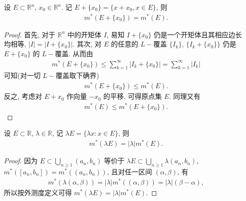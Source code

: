 \documentclass[../../main.tex]{subfiles}
\begin{document}
\begin{theorem}[外测度的平移不变性]\label{theorem:外测度的平移不变性}
设 \(E \subset \mathbb{R}^n\), \(x_0 \in \mathbb{R}^n\). 记 \(E + \{x_0\} = \{x + x_0, x \in E\}\), 则
\begin{align}
m^*(E + \{x_0\}) = m^*(E). \label{eq:2.1}
\end{align}
\end{theorem}
\begin{proof}
首先, 对于 \(\mathbb{R}^n\) 中的开矩体 \(I\), 易知 \(I + \{x_0\}\) 仍是一个开矩体且其相应边长均相等, \(|I| = |I + \{x_0\}|\). 其次, 对 \(E\) 的任意的 \(L -\)覆盖 \(\{I_k\}\), \(\{I_k + \{x_0\}\}\) 仍是 \(E + \{x_0\}\) 的 \(L -\)覆盖. 从而由
\begin{align*}
m^*(E + \{x_0\}) \leq \sum_{k = 1}^{\infty} |I_k + \{x_0\}| = \sum_{k = 1}^{\infty} |I_k|
\end{align*}
可知(对一切 \(L -\)覆盖取下确界)
\begin{align*}
m^*(E + \{x_0\}) \leq m^*(E).
\end{align*}
反之, 考虑对 \(E + x_0\) 作向量 \(-x_0\) 的平移, 可得原点集 \(E\). 同理又有
\begin{align*}
m^*(E) \leq m^*(E + \{x_0\}).
\end{align*} 
\end{proof}

\begin{theorem}[外测度的数乘]\label{theorem:外测度的数乘}
设 \(E \subset \mathbb{R}\), \(\lambda \in \mathbb{R}\), 记 \(\lambda E = \{ \lambda x : x \in E\}\), 则
\begin{align*}
m^*(\lambda E) = |\lambda| m^*(E).
\end{align*}
\end{theorem}
\begin{proof}
因为 \(E \subset \bigcup_{n \geq 1} (a_n, b_n)\) 等价于 \(\lambda E \subset \bigcup_{n \geq 1} \lambda (a_n, b_n)\), \(m^*([a_n, b_n]) = m^*((a_n, b_n))\), 且对任一区间 \((\alpha, \beta)\), 有
\begin{align*}
m^*(\lambda (\alpha, \beta)) = |\lambda| m^*((\alpha, \beta)) = |\lambda| (\beta - \alpha),
\end{align*}
所以按外测度定义可得 \(m^*(\lambda E) = |\lambda| m^*(E)\). 
\end{proof}
\end{document}
